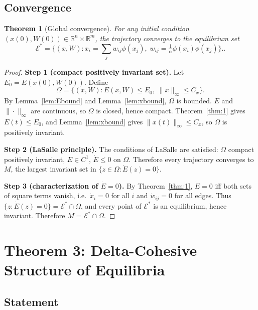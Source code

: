 \documentclass[3p]{elsarticle}
\newtheorem{theorem}{Theorem}
\newcommand{\R}{\mathbb{R}}
\newcommand{\E}{\mathcal{E}}
\begin{document}
\subsection{Convergence}

\begin{theorem}[Global convergence] \label{thm:2}
  For any initial condition $(x(0),W(0))\in\R^n\times\R^m$, the trajectory converges to the equilibrium set
  \[
  \E^* = \bigl\{(x,W): x_i=\sum_j w_{ij}\phi(x_j),\; w_{ij}=\tfrac{1}{\alpha}\phi(x_i)\phi(x_j) \bigr\}..
  \]
\end{theorem}

\begin{proof}
  \textbf{Step 1 (compact positively invariant set).} Let $E_0=E(x(0),W(0))$. Define
  \[
  \Omega = \{(x,W): E(x,W)\le E_0,\; \|x\|_\infty\le C_x\}.
  \]
  By Lemma~\ref{lem:Ebound} and Lemma~\ref{lem:xbound}, $\Omega$ is bounded. $E$ and $\|\cdot\|_\infty$ are continuous, so $\Omega$ is closed, hence compact. Theorem~\ref{thm:1} gives $E(t)\le E_0$, and Lemma~\ref{lem:xbound} gives $\|x(t)\|_\infty\le C_x$, so $\Omega$ is positively invariant.

  \textbf{Step 2 (LaSalle principle).} The conditions of LaSalle are satisfied: $\Omega$ compact positively invariant, $E\in C^1$, $\dot E\le 0$ on $\Omega$. Therefore every trajectory converges to $M$, the largest invariant set in $\{z\in\Omega:\dot E(z)=0\}$.

  \textbf{Step 3 (characterization of $\dot E=0$).} By Theorem~\ref{thm:1}, $\dot E=0$ iff both sets of square terms vanish, i.e.\ $\dot x_i=0$ for all $i$ and $\dot w_{ij}=0$ for all edges. Thus $\{z:\dot E(z)=0\} = \E^*\cap\Omega$, and every point of $\E^*$ is an equilibrium, hence invariant. Therefore $M=\E^*\cap\Omega$.
\end{proof}

\section{Theorem 3: Delta-Cohesive Structure of Equilibria}

\subsection{Statement}
\end{document}
